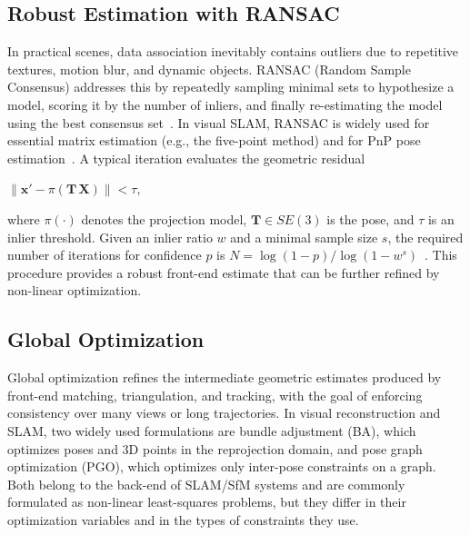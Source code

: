 \subsection{Robust Estimation with RANSAC}
In practical scenes, data association inevitably contains outliers due to repetitive textures, motion blur, and dynamic objects. RANSAC (Random Sample Consensus) addresses this by repeatedly sampling minimal sets to hypothesize a model, scoring it by the number of inliers, and finally re-estimating the model using the best consensus set~\cite{fischler1981ransac}. In visual SLAM, RANSAC is widely used for essential matrix estimation (e.g., the five-point method) and for PnP pose estimation~\cite{nister2004fivepointmethod,matas2005ransac}. A typical iteration evaluates the geometric residual
\begin{center}
    $\displaystyle \| \mathbf{x}' - \pi(\mathbf{T}\,\mathbf{X}) \| < \tau, $
\end{center}
where $\pi(\cdot)$ denotes the projection model, $\mathbf{T}\in SE(3)$ is the pose, and $\tau$ is an inlier threshold. Given an inlier ratio $w$ and a minimal sample size $s$, the required number of iterations for confidence $p$ is $N=\log(1-p)/\log(1-w^s)$~\cite{fischler1981ransac}. This procedure provides a robust front-end estimate that can be further refined by non-linear optimization.

\subsection{Global Optimization}
Global optimization refines the intermediate geometric estimates produced by front-end matching, triangulation, and tracking, with the goal of enforcing consistency over many views or long trajectories. In visual reconstruction and SLAM, two widely used formulations are bundle adjustment (BA), which optimizes poses and 3D points in the reprojection domain, and pose graph optimization (PGO), which optimizes only inter-pose constraints on a graph. Both belong to the back-end of SLAM/SfM systems and are commonly formulated as non-linear least-squares problems, but they differ in their optimization variables and in the types of constraints they use.

